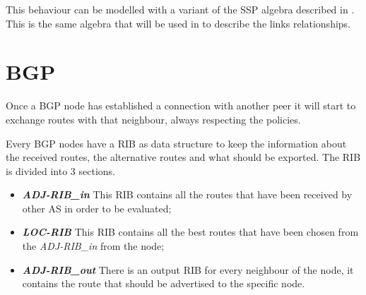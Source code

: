 This behaviour can be modelled with a variant of the \ac{SSP} algebra described
in \cite{daggitt2018rate}.
This is the same algebra that will be used in  to describe the links
relationships.


\section{BGP}
\label{sec:bgp_intro}

Once a \ac{BGP} node has established a connection with another peer it will
start to exchange routes with that neighbour, always respecting the policies.

Every \ac{BGP} nodes have a \ac{RIB} as data structure to keep the information
about the received routes, the alternative routes and what should be exported.
The \ac{RIB} is divided into \num{3} sections.
\begin{itemize}
	\item \textbf{\textit{ADJ-RIB\_in}} This \ac{RIB} contains all the routes
		that have been received by other \ac{AS} in order to be evaluated;
	\item \textbf{\textit{LOC-RIB}} This \ac{RIB} contains all the best routes
		that have been chosen from the \textit{ADJ-RIB\_in} from the node;
	\item \textbf{\textit{ADJ-RIB\_out}} There is an output \ac{RIB} for every
		neighbour of the node, it contains the route that should be advertised 
		to the specific node.
\end{itemize}

